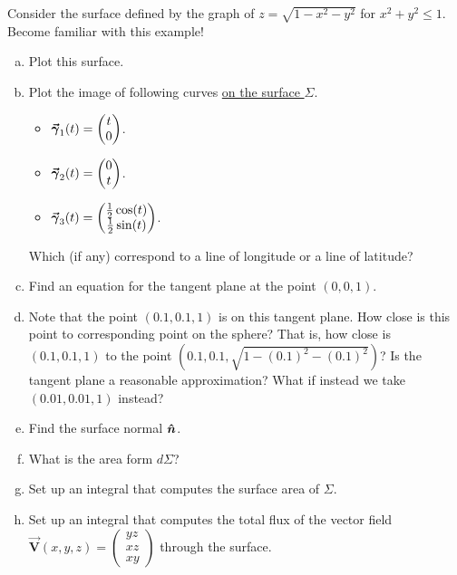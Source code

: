 \documentclass[12pt]{article} %
\newcommand{\vecfieldV}{\boldsymbol{\vec{V}}}
\begin{document}
\newpage
\begin{problem}
    Consider the surface defined by the graph of $z = \sqrt{1-x^2-y^2}$ for $x^2+y^2\leq 1$. Become familiar with this example!
    \begin{enumerate}[(a)]
        \item Plot this surface.
        \item Plot the image of following curves \underline{on the surface $\Sigma$}. 
        \begin{itemize}
            \item $\boldsymbol{\vec{\gamma}}_1(t) = \begin{pmatrix} t\\ 0 \end{pmatrix}$.
            \item $\boldsymbol{\vec{\gamma}}_2(t) = \begin{pmatrix} 0 \\ t \end{pmatrix}$. 
            \item $\boldsymbol{\vec{\gamma}}_3(t) = \begin{pmatrix} \frac{1}{2} \cos(t) \\ \frac{1}{2} \sin(t) \end{pmatrix}$.
        \end{itemize}
        Which (if any) correspond to a line of longitude or a line of latitude?
        \item Find an equation for the tangent plane at the point $(0,0,1)$.
        \item Note that the point $(0.1,0.1,1)$ is on this tangent plane.  How close is this point to corresponding point on the sphere? That is, how close is $(0.1,0.1,1)$ to the point $(0.1,0.1,\sqrt{1-(0.1)^2-(0.1)^2})$? Is the tangent plane a reasonable approximation? What if instead we take $(0.01,0.01,1)$ instead?
        \item Find the surface normal $\boldsymbol{\hat{n}}$.
        \item What is the area form $d\Sigma$?
        \item Set up an integral that computes the surface area of $\Sigma$.
        \item Set up an integral that computes the total flux of the vector field $\vecfieldV(x,y,z) = \begin{pmatrix} yz \\ xz \\ xy \end{pmatrix}$ through the surface.
    \end{enumerate}
\end{problem}
\begin{solution}

\end{solution}
\end{document}
